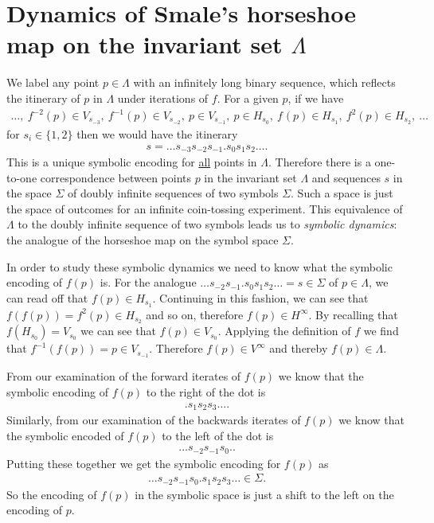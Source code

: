 \section{Dynamics of Smale's horseshoe map on the invariant set $\Lambda$}
We label any point $p\in \Lambda$ with an infinitely long binary sequence, which reflects the itinerary of $p$ in $\Lambda$ under iterations of $f$. For a given $p$, if we have 
\begin{align}
	\ldots,\
	f^{-2}(p) \in V_{s_{-3}},\
	f^{-1}(p) \in V_{s_{-2}},\
	p \in V_{s_{-1}},\
	p \in H_{s_{0}},\
	f^{}(p) \in H_{s_{1}},\
	f^{2}(p) \in H_{s_{2}},\
\ldots	
\end{align}
for $s_i\in \{1,2\}$ then we would have the itinerary 
\begin{align}
	\boxed{
s  = \ldots s_{-3}s_{-2}s_{-1} \bm{.}  s_0 s_{1}s_{2}\ldots.
	}
\end{align}
This is a unique symbolic encoding for \underline{all} points in $\Lambda$. Therefore there is a one-to-one correspondence between points $p$ in the invariant set $\Lambda$ and sequences $s$ in the space $\Sigma$ of doubly infinite sequences of two symbols $\Sigma$. Such a space is just the space of outcomes for an infinite coin-tossing experiment. This equivalence of $\Lambda$ to the doubly infinite sequence of two symbols leads us to \emph{symbolic dynamics}: the analogue of the horseshoe map on the symbol space $\Sigma$.

In order to study these symbolic dynamics we need to know what the symbolic encoding of $f(p)$ is. For the analogue $\ldots s_{-2}s_{-1}\bm{.} s_0 s_1 s_2 \ldots = s\in \Sigma$ of $p\in \Lambda $, we can read off that $f(p)\in H_{s_1}$. Continuing in this fashion, we can see that $f(f(p))=f^{2}(p) \in H_{s_2}$ and so on, therefore $f(p)\in H^{\infty }$. By recalling that $f(H_{s_0}) = V_{s_0}$ we can see that $f(p) \in V_{s_0}$. Applying the definition of $f$ we find that $f^{-1}(f(p)) = p \in V_{s_{-1}}$. Therefore $f(p)\in V^{\infty }$ and thereby $f(p) \in \Lambda$. 

From our examination of the forward iterates of $f(p)$ we know that the symbolic encoding of $f(p)$ to the right of the dot is
\begin{align}
	\bm{.}s_1 s_2 s_3\ldots. 
\end{align}
Similarly, from our examination of the backwards iterates of $f(p)$ we know that the symbolic encoded of $f(p)$ to the left of the dot is
\begin{align}
\ldots s_{-2} s_{-1} s_{0} \bm{.}. 
\end{align}
Putting these together we get the symbolic encoding for $f(p)$ as 
\begin{align}
	\ldots s_{-2} s_{-1} s_{0} \bm{.} s_1 s_2 s_3 \ldots \in \Sigma.
\end{align}
So the encoding of $f(p)$ in the symbolic space is just a shift to the left on the encoding of $p$.

